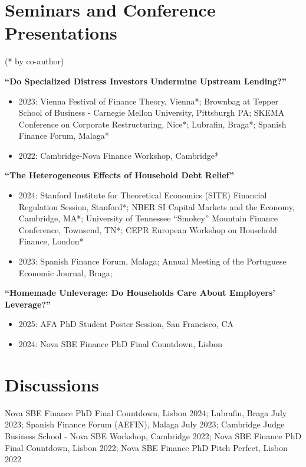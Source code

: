 \documentclass[letterpaper]{article}
\newenvironment{itemize*}{
  \begin{list}{}{
    \setlength{\leftmargin}{1.5em}
  }
}{
  \end{list}
}
\begin{document}
\section*{Seminars and Conference Presentations}
\vspace{-0.1in}
(* by co-author)
\begin{itemize*}
\item \textbf{``Do Specialized Distress Investors Undermine Upstream Lending?''}
\begin{itemize}
\item 2023: Vienna Festival of Finance Theory, Vienna*; Brownbag at Tepper School of Business - Carnegie Mellon University, Pittsburgh PA; SKEMA Conference on Corporate Restructuring, Nice*; Lubrafin, Braga*; Spanish Finance Forum, Malaga*
\item 2022: Cambridge-Nova Finance Workshop, Cambridge*
\end{itemize}
\item \textbf{``The Heterogeneous Effects of Household Debt Relief''}
\begin{itemize}
\item 2024: Stanford Institute for Theoretical Economics (SITE) Financial Regulation Session, Stanford*; NBER SI Capital Markets and the Economy, Cambridge, MA*; University of Tennessee ``Smokey'' Mountain Finance Conference, Townsend, TN*; CEPR European Workshop on Household Finance, London*
\item 2023: Spanish Finance Forum, Malaga; Annual Meeting of the Portuguese Economic Journal, Braga; 
\end{itemize}
\item \textbf{``Homemade Unleverage: Do Households Care About Employers' Leverage?''}
\begin{itemize}
\item 2025: AFA PhD Student Poster Session, San Francisco, CA
\item 2024: Nova SBE Finance PhD Final Countdown, Lisbon
\end{itemize}
\end{itemize*}

\section*{Discussions}
\begin{itemize*}
\item Nova SBE Finance PhD Final Countdown, Lisbon 2024; Lubrafin, Braga July 2023; Spanish Finance Forum (AEFIN), Malaga July 2023; Cambridge Judge Business School - Nova SBE Workshop,  Cambridge 2022; Nova SBE Finance PhD Final Countdown, Lisbon 2022; Nova SBE Finance PhD Pitch Perfect, Lisbon 2022
\end{itemize*}
\end{document}
